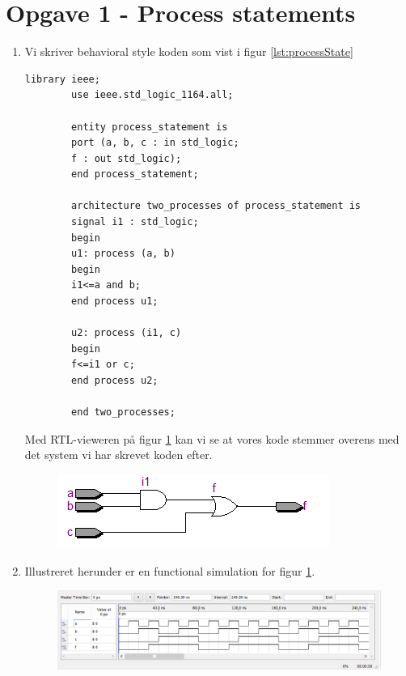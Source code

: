 \section{Opgave 1 - Process statements}
\begin{enumerate}
	\item[1)]
	Vi skriver behavioral style koden som vist i figur \ref{lst:processState}
		
		\begin{lstlisting}[caption={Behavioral style kode for en AND og OR gate},label={lst:processState}]
		library ieee;
		use ieee.std_logic_1164.all;
		
		entity process_statement is 
		port (a, b, c : in std_logic;
		f : out std_logic);
		end process_statement;
		
		architecture two_processes of process_statement is
		signal i1 : std_logic;
		begin
		u1: process (a, b)
		begin
		i1<=a and b;
		end process u1;
		
		u2: process (i1, c)
		begin
		f<=i1 or c;
		end process u2;
		
		end two_processes;
		\end{lstlisting}
		Med RTL-vieweren på figur \ref{fig:RTL process}  kan vi se at vores kode stemmer overens med det system vi har skrevet koden efter.
		\begin{figure}[h]
			\centering
			\includegraphics[scale=0.8]{pictures/Oevelse5/opg1/RTL_process.JPG}
			\caption{}
			\label{fig:RTL process}
		\end{figure}
		\newpage
		\item[2)]
		Illustreret herunder er en functional simulation for figur \ref{fig:RTL process}.
		\begin{figure}[h]
			\centering
			\includegraphics[scale=0.8]{pictures/Oevelse5/opg1/func_sim_process.JPG}
			\caption{}
			\label{fig:Functional simulation process koden}
		\end{figure}
		

\end{enumerate}
